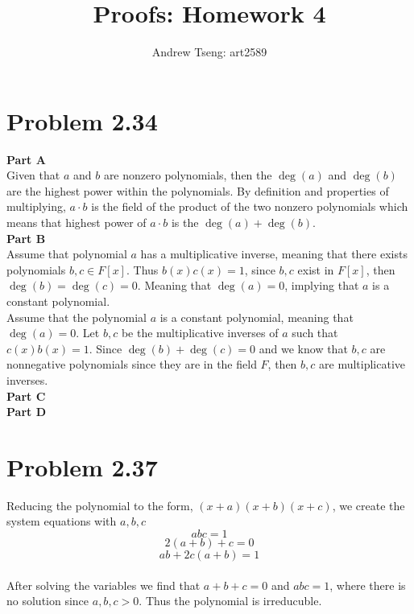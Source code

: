 \documentclass[10pt]{amsart}
\title{Proofs: Homework 4}
\author{Andrew Tseng: art2589}
\begin{document}
\maketitle
\thispagestyle{empty}

\section*{\large \textbf{Problem 2.34}}
\begin{addmargin}{5pt}
\textbf{\small Part A} \\
Given that $a$ and $b$ are nonzero polynomials, then the $\deg(a)$ and $\deg(b)$
are the highest power within the polynomials. By definition and properties of
multiplying, $a \cdot b$ is the field of the product of the two nonzero
polynomials which means that highest power of $a \cdot b$ is the $\deg(a)
+ \deg(b)$.  \\

\noindent \textbf{\small Part B} \\
Assume that polynomial $a$ has a multiplicative inverse, meaning that there
exists polynomials $b,c \in F[x]$. Thus $b(x)c(x) = 1$, since $b,c$ exist in
$F[x]$, then $\deg(b) = \deg(c) = 0$. Meaning that $\deg(a) = 0$, implying
that $a$ is a constant polynomial. \\

\noindent Assume that the polynomial $a$ is a constant polynomial, meaning that 
$\deg(a) = 0$. Let $b,c$ be the multiplicative inverses of $a$ such that
$c(x)b(x) = 1$. Since $\deg(b) + \deg(c) = 0$ and we know that $b,c$ are
nonnegative polynomials since they are in the field $F$, then $b,c$ are
multiplicative inverses. \\

\noindent \textbf{\small Part C} \\

\noindent \textbf{\small Part D} \\

\end{addmargin}

\section*{\large \textbf{Problem 2.37}} 
\begin{addmargin}{5pt}   
Reducing the polynomial to the form, $(x + a)(x + b)(x + c)$, we create the 
system equations with $a,b,c$
\[abc           = 1\]
\[2(a + b) + c  = 0\]
\[ab + 2c(a+b)  = 1\]
\\
After solving the variables we find that $a + b + c = 0$ and $abc = 1$, where
there is no solution since $a,b,c > 0$. Thus the polynomial is irreducuble. \\
\end{addmargin}
\end{document}
